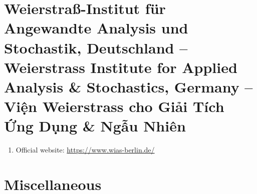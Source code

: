 \documentclass{article}
\begin{document}
\section{Weierstraß-Institut für Angewandte Analysis und Stochastik, Deutschland -- Weierstrass Institute for Applied Analysis \& Stochastics, Germany -- Viện Weierstrass cho Giải Tích Ứng Dụng \& Ngẫu Nhiên}
\begin{enumerate}
	\item Official website: \url{https://www.wias-berlin.de/}
\end{enumerate}


\section{Miscellaneous}


\printbibliography[heading=bibintoc]
	
\end{document}
